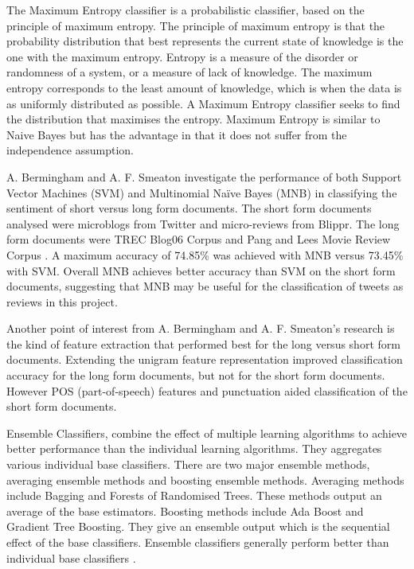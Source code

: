 The Maximum Entropy classifier is a probabilistic classifier, based on the principle of maximum entropy. The principle of maximum entropy is that the probability distribution that best represents the current state of knowledge is the one with the maximum entropy. Entropy is a measure of the disorder or randomness of a system, or a measure of lack of knowledge. The maximum entropy corresponds to the least amount of knowledge, which is when the data is as uniformly distributed as possible. A Maximum Entropy classifier seeks to find the distribution that maximises the entropy. Maximum Entropy is similar to Naive Bayes but has the advantage in that it does not suffer from the independence assumption. 

A. Bermingham and A. F. Smeaton \cite{Berm2010} investigate the performance of both Support Vector Machines (SVM) and Multinomial Naïve Bayes (MNB) in classifying the sentiment of short versus long form documents. The short form documents analysed were microblogs from Twitter and micro-reviews from Blippr. The long form documents were TREC Blog06 Corpus and Pang and Lees Movie Review Corpus \cite{panglee2004}. A maximum accuracy of 74.85\% was achieved with MNB versus 73.45\% with SVM. Overall MNB achieves better accuracy than SVM on the short form documents, suggesting that MNB may be useful for the classification of tweets as reviews in this project.

Another point of interest from A. Bermingham and A. F. Smeaton's research is the kind of feature extraction that performed best for the long versus short form documents. Extending the unigram feature representation improved classification accuracy for the long form documents, but not for the short form documents. However POS (part-of-speech) features and punctuation aided classification of the short form documents. 

Ensemble Classifiers, combine the effect of multiple learning algorithms to achieve better performance than the individual learning algorithms. They aggregates various individual base classifiers. There are two major ensemble methods, averaging ensemble methods and boosting ensemble methods. Averaging methods include Bagging and Forests of Randomised Trees. These methods output an average of the base estimators. Boosting methods include Ada Boost and Gradient Tree Boosting. They give an ensemble output which is the sequential effect of the base classifiers. Ensemble classifiers generally perform better than individual base classifiers \cite{Opitz1999}. 

